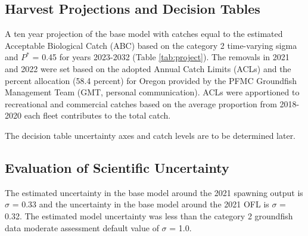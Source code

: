 \documentclass[11pt,
  english,
  a4paper,
]{article}
\begin{document}

\hypertarget{harvest-projections-and-decision-tables}{%
\subsection{Harvest Projections and Decision Tables}\label{harvest-projections-and-decision-tables}}

\leavevmode\tagmcend\tagstructend


A ten year projection of the base model with catches equal to the estimated Acceptable Biological Catch (ABC) based on the category 2 time-varying sigma and {\(P^*\)\leavevmode\tagmcend\tagstructend} = 0.45 for years 2023-2032 (Table \ref{tab:project}). The removals in 2021 and 2022 were set based on the adopted Annual Catch Limits (ACLs) and the percent allocation (58.4 percent) for Oregon provided by the PFMC Groundfish Management Team (GMT, personal communication). ACLs were apportioned to recreational and commercial catches based on the average proportion from 2018-2020 each fleet contributes to the total catch.

\leavevmode\tagmcend\tagstructend\par


The decision table uncertainty axes and catch levels are to be determined later.

\leavevmode\tagmcend\tagstructend\par


\hypertarget{evaluation-of-scientific-uncertainty}{%
\subsection{Evaluation of Scientific Uncertainty}\label{evaluation-of-scientific-uncertainty}}

\leavevmode\tagmcend\tagstructend


The estimated uncertainty in the base model around the 2021 spawning output is {\(\sigma\)\leavevmode\tagmcend\tagstructend} = 0.33 and the uncertainty in the base model around the 2021 OFL is {\(\sigma\)\leavevmode\tagmcend\tagstructend} = 0.32. The estimated model uncertainty was less than the category 2 groundfish data moderate assessment default value of {\(\sigma\)\leavevmode\tagmcend\tagstructend} = 1.0.
\end{document}
